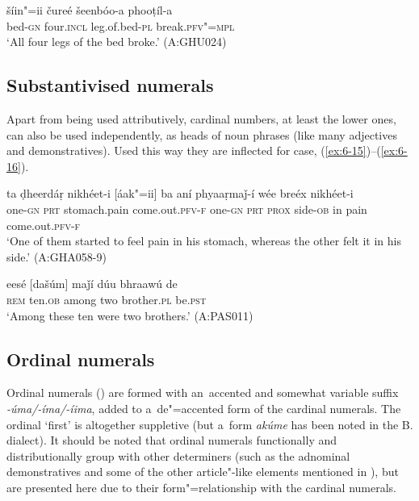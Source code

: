 {\begin{exe}
\ex
\label{ex:6-14}
\gll šíin"=ii čureé šeenbóo-a phooṭíl-a \\
bed-\textsc{gn} four.\textsc{incl} leg.of.bed-\textsc{pl} break.\textsc{pfv"=mpl} \\
\glt `All four legs of the bed broke.' (A:GHU024)
\end{exe}

\subsection{Substantivised numerals}
\label{subsec:6-4-2}


Apart from being used attributively, cardinal numbers, at least the lower ones, can also be used independently, as heads of noun phrases (like many adjectives and demonstratives). Used this way they are inflected for case, (\ref{ex:6-15})--(\ref{ex:6-16}).

\begin{exe}
\ex
\label{ex:6-15}
\gll [áak"=ii] ta ḍheerdáṛ nikhéet-i [áak"=ii] ba  aní phyaaṛmaǰ-í wée
breéx nikhéet-i \\
one-\textsc{gn} \textsc{prt} stomach.pain come.out.\textsc{pfv-f} one-\textsc{gn} \textsc{prt} \textsc{prox} side-\textsc{ob} in pain come.out.\textsc{pfv-f} \\
\glt `One of them started to feel pain in his stomach, whereas the other felt it in his side.'
(A:GHA058-9)

\ex
\label{ex:6-16}
\gll eesé [dašúm] maǰí dúu bhraawú de  \\
\textsc{rem} ten.\textsc{ob} among two brother.\textsc{pl} be.\textsc{pst}  \\
\glt `Among these ten were two brothers.' (A:PAS011)
\end{exe}

\subsection{Ordinal numerals}
\label{subsec:6-4-3}

Ordinal numerals () are formed with an~accented and somewhat variable suffix \textit{-úma/-íma/-íima}, added to a~de"=accented form of the cardinal numerals. The ordinal `first' is altogether suppletive (but a~form \textit{akúme} has been noted in the B. dialect). It should be noted that ordinal numerals functionally and distributionally group with other determiners (such as the adnominal demonstratives and some of the other article"-like elements mentioned in ), but are presented here due to their form"=relationship with the cardinal numerals.


}
